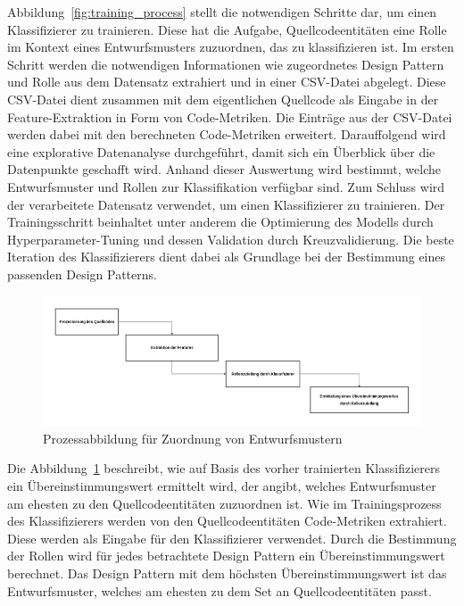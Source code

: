 Abbildung~\ref{fig:training_process} stellt die notwendigen Schritte dar, um einen Klassifizierer zu trainieren. Diese hat die Aufgabe,
Quellcodeentitäten eine Rolle im Kontext eines Entwurfsmusters zuzuordnen, das zu klassifizieren ist. Im ersten Schritt werden die notwendigen Informationen wie zugeordnetes Design Pattern und Rolle aus dem Datensatz extrahiert und in einer CSV-Datei abgelegt. 
Diese CSV-Datei dient zusammen mit dem eigentlichen Quellcode als Eingabe in der Feature-Extraktion in Form von Code-Metriken. Die Einträge aus der CSV-Datei werden dabei mit den berechneten Code-Metriken erweitert.
Darauffolgend wird eine explorative Datenanalyse durchgeführt, damit sich ein Überblick über die Datenpunkte geschafft wird. Anhand dieser Auswertung wird bestimmt, welche Entwurfsmuster und Rollen zur Klassifikation verfügbar sind.
Zum Schluss wird der verarbeitete Datensatz verwendet, um einen Klassifizierer zu trainieren. Der Trainingsschritt beinhaltet unter anderem die Optimierung des Modells durch Hyperparameter-Tuning und dessen Validation durch Kreuzvalidierung.
Die beste Iteration des Klassifizierers dient dabei als Grundlage bei der Bestimmung eines passenden Design Patterns.


\begin{figure}[h]
    \centering
    \includegraphics[scale=0.5]{figures/pattern_matching_overvierw.png}
    \caption{Prozessabbildung für Zuordnung von Entwurfsmustern}
    \label{fig:pattern_matching_overview}
\end{figure}

Die Abbildung~\ref{fig:pattern_matching_overview} beschreibt, wie auf Basis des vorher trainierten Klassifizierers ein Übereinstimmungswert ermittelt wird, der angibt,
welches Entwurfsmuster am ehesten zu den Quellcodeentitäten zuzuordnen ist. Wie im Trainingsprozess des Klassifizierers werden von den Quellcodeentitäten Code-Metriken extrahiert.
Diese werden als Eingabe für den Klassifizierer verwendet. Durch die Bestimmung der Rollen wird für jedes betrachtete Design Pattern ein Übereinstimmungswert berechnet.
Das Design Pattern mit dem höchsten Übereinstimmungswert ist das Entwurfsmuster, welches am ehesten zu dem Set an Quellcodeentitäten passt.

